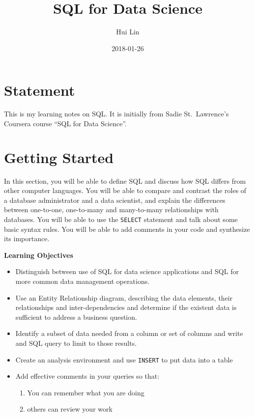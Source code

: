 \documentclass[]{book}
\title{SQL for Data Science}
\author{Hui Lin}
\date{2018-01-26}
\providecommand{\tightlist}{%
  \setlength{\itemsep}{0pt}\setlength{\parskip}{0pt}}
\theoremstyle{definition}
\theoremstyle{definition}
\theoremstyle{remark}
\begin{document}
\maketitle

\thispagestyle{empty}
\begin{center}
\end{center}

\setlength{\abovedisplayskip}{-5pt}
\setlength{\abovedisplayshortskip}{-5pt}

{
\setcounter{tocdepth}{2}
\tableofcontents
}
\chapter*{Statement}\label{statement}


This is my learning notes on SQL. It is initially from Sadie
St.~Lawrence's Coursera course ``SQL for Data Science''.

\mainmatter

\chapter{Getting Started}\label{getting-started}

In this section, you will be able to define SQL and discuss how SQL
differs from other computer languages. You will be able to compare and
contrast the roles of a database administrator and a data scientist, and
explain the differences between one-to-one, one-to-many and many-to-many
relationships with databases. You will be able to use the
\texttt{SELECT} statement and talk about some basic syntax rules. You
will be able to add comments in your code and synthesize its importance.

\textbf{Learning Objectives}

\begin{itemize}
\tightlist
\item
  Distinguish between use of SQL for data science applications and SQL
  for more common data management operations.
\item
  Use an Entity Relationship diagram, describing the data elements,
  their relationships and inter-dependencies and determine if the
  existent data is sufficient to address a business question.
\item
  Identify a subset of data needed from a column or set of columns and
  write and SQL query to limit to those results.
\item
  Create an analysis environment and use \texttt{INSERT} to put data
  into a table
\item
  Add effective comments in your queries so that:

  \begin{enumerate}
  \def\labelenumi{\arabic{enumi}.}
  \tightlist
  \item
    You can remember what you are doing
  \item
    others can review your work
  \end{enumerate}
\end{itemize}
\end{document}
